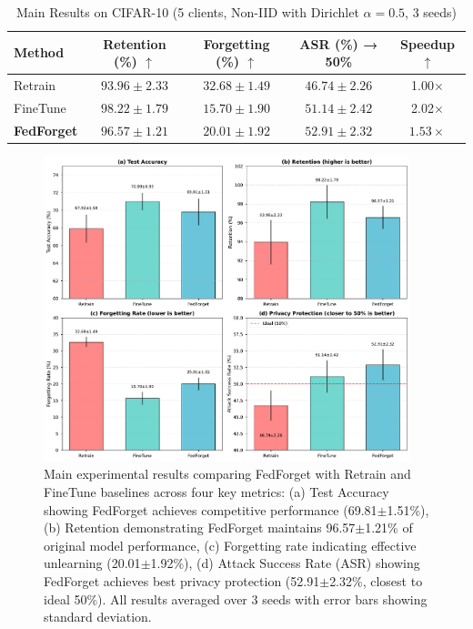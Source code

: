 \documentclass[10pt,twocolumn]{article}
\begin{document}
\begin{table}[t]
\centering
\caption{Main Results on CIFAR-10 (5 clients, Non-IID with Dirichlet $\alpha=0.5$, 3 seeds)}
\label{tab:main_results}
\begin{tabular}{lcccc}
\toprule
Method & Retention (\%) $\uparrow$ & Forgetting (\%) $\uparrow$ & ASR (\%) → 50\% & Speedup $\uparrow$ \\
\midrule
Retrain & $93.96 \pm 2.33$ & $\mathbf{32.68 \pm 1.49}$ & $46.74 \pm 2.26$ & 1.00$\times$ \\
FineTune & $\mathbf{98.22 \pm 1.79}$ & $15.70 \pm 1.90$ & $51.14 \pm 2.42$ & 2.02$\times$ \\
\textbf{FedForget} & $\mathbf{96.57 \pm 1.21}$ & $20.01 \pm 1.92$ & $\mathbf{52.91 \pm 2.32}$ & $\mathbf{1.53}\times$ \\
\bottomrule
\end{tabular}
\end{table}

\begin{figure}[t]
\centering
\includegraphics[width=0.95\textwidth]{figures/figure1_main_results.pdf}
\caption{Main experimental results comparing FedForget with Retrain and FineTune baselines across four key metrics: (a) Test Accuracy showing FedForget achieves competitive performance (69.81$\pm$1.51\%), (b) Retention demonstrating FedForget maintains 96.57$\pm$1.21\% of original model performance, (c) Forgetting rate indicating effective unlearning (20.01$\pm$1.92\%), (d) Attack Success Rate (ASR) showing FedForget achieves best privacy protection (52.91$\pm$2.32\%, closest to ideal 50\%). All results averaged over 3 seeds with error bars showing standard deviation.}
\label{fig:main_results}
\end{figure}
\end{document}
